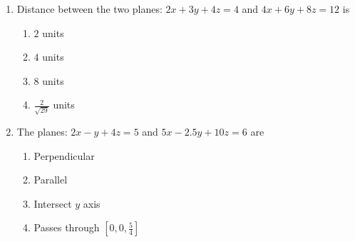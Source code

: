 \documentclass{article}
\theoremstyle{remark}
\begin{document}
\begin{enumerate}[resume]
\item Distance between the two planes: $2x+3y+4z=4$ and $4x+6y+8z=12$ is \label{prob:22}
\begin{enumerate}
\item $2$ units
\item $4$ units
\item $8$ units
\item $\frac{2}{\sqrt{29}}$ units
\end{enumerate}
\item The planes: $2x-y+4z=5$ and $5x-2.5y+10z=6$ are \label{prob:23}
\begin{enumerate}
\item Perpendicular
\item Parallel
\item Intersect $y$ axis
\item Passes through $[0,0,\frac{5}{4}]$
\end{enumerate}
\end{enumerate}
\end{document}
